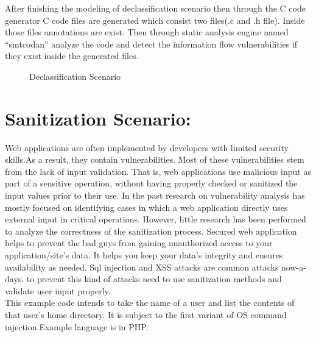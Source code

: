  After finishing the modeling of declassification scenario then through the C code generator C code files are generated which consist two files(.c and .h file). Inside those files annotations are exist. Then through static analysis engine named \enquote{smtcodan} analyze the code and detect the information flow vulnerabilities if they exist inside the generated files.
 
\begin{figure}[htbp]
	\centering
	\label{declassification_scenario}
	\caption{Declassification Scenario}
\end{figure}


\section{Sanitization Scenario:}
Web applications are often implemented by developers with limited security skills.As a result, they
contain vulnerabilities. Most of these vulnerabilities stem
from the lack of input validation. That is, web applications
use malicious input as part of a sensitive operation, without having properly checked or sanitized the input values
prior to their use.
In the past research on vulnerability analysis has mostly focused on identifying cases in which a web application directly uses external input in critical operations. However,
little research has been performed to analyze the correctness of the sanitization process. Secured web application helps to prevent the bad guys from gaining unauthorized access to your application/site's data. It helps you keep your data's integrity and ensures availability as needed. Sql injection and XSS attacks are common attacks now-a-days. to prevent this kind of attacks need to use sanitization methods and validate user input properly.\\
This example code intends to take the name of a user and list the contents of that user's home directory. It is subject to the first variant of OS command injection.Example language is in PHP.

